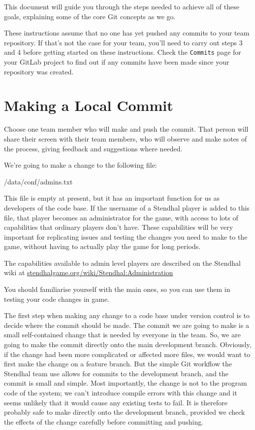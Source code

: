 \documentclass[
]{book}
\newenvironment{Shaded}{\begin{snugshade}}{\end{snugshade}}
\newcommand{\NormalTok}[1]{#1}
\begin{document}
This document will guide you through the steps needed to achieve all of these goals, explaining some of the core Git concepts as we go.

These instructions assume that no one has yet pushed any commits to your team repository. If that's not the case for your team, you'll need to carry out steps 3 and 4 before getting started on these instructions. Check the \texttt{Commits} page for your GitLab project to find out if any commits have been made since your repository was created.

\hypertarget{locommit}{%
\section{Making a Local Commit}\label{locommit}}

Choose one team member who will make and push the commit. That person will share their screen with their team members, who will observe and make notes of the process, giving feedback and suggestions where needed.

We're going to make a change to the following file:

\begin{Shaded}
\begin{Highlighting}[]
\NormalTok{/data/conf/admins.txt}
\end{Highlighting}
\end{Shaded}

This file is empty at present, but it has an important function for us as developers of the code base. If the username of a Stendhal player is added to this file, that player becomes an administrator for the game, with access to lots of capabilities that ordinary players don't have. These capabilities will be very important for replicating issues and testing the changes you need to make to the game, without having to actually play the game for long periods.

The capabilities available to admin level players are described on the Stendhal wiki at \href{https://stendhalgame.org/wiki/Stendhal:Administration}{stendhalgame.org/wiki/Stendhal:Administration}

You should familiarise yourself with the main ones, so you can use them in testing your code changes in game.

The first step when making any change to a code base under version control is to decide where the commit should be made. The commit we are going to make is a small self-contained change that is needed by everyone in the team. So, we are going to make the commit directly onto the main development branch. Obviously, if the change had been more complicated or affected more files, we would want to first make the change on a feature branch. But the simple Git workflow the Stendhal team use allows for commits to the development branch, and the commit is small and simple. Most importantly, the change is not to the program code of the system; we can't introduce compile errors with this change and it seems unlikely that it would cause any existing tests to fail. It is therefore probably safe to make directly onto the development branch, provided we check the effects of the change carefully before committing and pushing.
\end{document}

